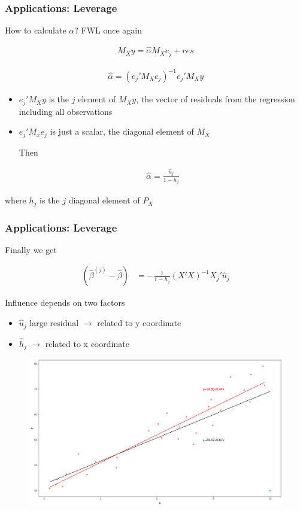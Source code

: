\documentclass[
  shownotes,
  xcolor={svgnames},
  hyperref={colorlinks,citecolor=DarkBlue,linkcolor=DarkRed,urlcolor=DarkBlue}
  , aspectratio=169]{beamer}
\begin{document}
\begin{frame}
\frametitle{Applications: Leverage}
How to calculate $\alpha$? FWL once again

\begin{align}
M_X y =\hat\alpha M_X e_j + res
\end{align}

\begin{align}
\hat\alpha = (e_j'M_X e_j)^{-1}  e_j'M_X y  
\end{align}

\begin{itemize}
\item $e_j'M_X y $ is the $j$ element of $M_Xy$, the vector of residuals from the regression including all observations
\item $e_j'M_xe_j$ is just a scalar, the diagonal element of $M_X$

Then 

\begin{align}
\hat\alpha = \frac{\hat u_j}{1-h_j}
\end{align}
\end{itemize}

where $h_j$ is the $j$ diagonal element of $P_X$


\end{frame}
\begin{frame}
\frametitle{Applications: Leverage}
Finally we get 

\begin{align}
  (\hat \beta^{(j)} - \hat \beta)&= - \frac{1}{1-h_j} (X'X)^{-1}X_j'\hat u_j
\end{align}

Influence depends on two factors
\begin{itemize}
  \item $\hat u_j$ large residual $\rightarrow$ related to y coordinate
  \item $\hat h_j$  $\rightarrow$ related to x coordinate
\end{itemize}

\begin{figure}[H] \centering
  \centering
  \includegraphics[scale=0.15]{figures/fig_1d.pdf}
  \\
  \tiny
\end{figure}
\end{frame}
\end{document}
